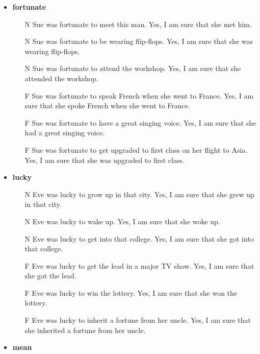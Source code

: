 \documentclass[11pt,fleqn]{article}
\newcommand{\6}{\mbox{$[\hspace*{-.6mm}[$}}
\newcommand{\9}{\mbox{$]\hspace*{-.6mm}]$}}
\begin{document}
\begin{itemize}[leftmargin=10pt,itemsep=-1pt]
\item {\bf fortunate}

\begin{enumerate}[leftmargin=10pt,topsep=0pt,itemsep=0pt]

\item[N]  	Sue was fortunate to meet this man.	Yes, I am sure that she met him.
\item[N]  	Sue was fortunate to be wearing flip-flops.	Yes, I am sure that she was wearing flip-flops.
\item[N]  	Sue was fortunate to attend the workshop.	Yes, I am sure that she attended the workshop.
\item[F]  	Sue was fortunate to speak French when she went to France.	Yes, I am sure that she spoke French when she went to France.
\item[F]  	Sue was fortunate to have a great singing voice.	Yes, I am sure that she had a great singing voice.
\item[F]  	Sue was fortunate to get upgraded to first class on her flight to Asia.	Yes, I am sure that she was upgraded to first class.

\end{enumerate}

\item {\bf lucky}

\begin{enumerate}[leftmargin=10pt,topsep=0pt,itemsep=0pt]

\item[N]  	Eve was lucky to grow up in that city.	Yes, I am sure that she grew up in that city.
\item[N]  	Eve was lucky to wake up.	Yes, I am sure that she woke up.
\item[N]  	Eve was lucky to get into that college.	Yes, I am sure that she got into that college.
\item[F]  	Eve was lucky to get the lead in a major TV show.	Yes, I am sure that she got the lead.
\item[F]  	Eve was lucky to win the lottery.	Yes, I am sure that she won the lottery.
\item[F]  	Eve was lucky to inherit a fortune from her uncle. 	Yes, I am sure that she inherited a fortune from her uncle.

\end{enumerate}

\item {\bf mean}

\begin{enumerate}[leftmargin=10pt,topsep=0pt,itemsep=0pt]


\end{enumerate}
\end{itemize}
\end{document}
